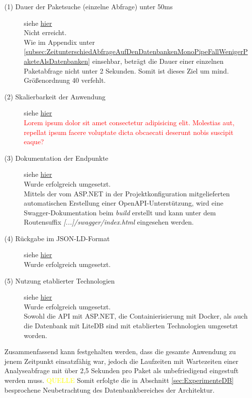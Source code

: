     \begin{description}
        \item[(1) Dauer der Paketsuche (einzelne Abfrage) unter 50ms] siehe \hyperref[nf:one]{\underline{hier}} \hfill \\
            Nicht erreicht.
            \\
            Wie im Appendix unter \ref{subsec:ZeitunterschiedAbfrageAufDenDatenbankenMonoPipeFallWenigerPaketeAlsDatenbanken} einsehbar, beträgt die Dauer einer einzelnen Paketabfrage nicht unter 2 Sekunden.
            Somit ist dieses Ziel um mind. Größenordnung 40 verfehlt.
        \item[(2) Skalierbarkeit der Anwendung] siehe \hyperref[nf:two]{\underline{hier}} \hfill \\
            \textcolor{red}{Lorem ipsum dolor sit amet consectetur adipisicing elit. Molestias aut, repellat ipsum facere voluptate dicta obcaecati deserunt nobis suscipit eaque?}
        \item[(3) Dokumentation der Endpunkte] siehe \hyperref[nf:three]{\underline{hier}} \hfill \\
            Wurde erfolgreich umgesetzt.
            \\
            Mittels der vom ASP.NET in der Projektkonfiguration mitgelieferten automatischen Erstellung einer OpenAPI-Unterstützung, wird eine Swagger-Dokumentation beim \textit{build} erstellt und kann unter dem Routensuffix \textit{[...]/swagger/index.html} eingesehen werden.
        \item[(4) Rückgabe im \acs{JSON-LD}-Format] siehe \hyperref[nf:four]{\underline{hier}} \hfill \\
            Wurde erfolgreich umgesetzt.
        \item[(5) Nutzung etablierter Technologien] siehe \hyperref[nf:five]{\underline{hier}} \hfill \\
            Wurde erfolgreich umgesetzt.
            \\
            Sowohl die \ac{API} mit ASP.NET, die Containierisierung mit Docker, als auch die Datenbank mit LiteDB sind mit etablierten Technologien umgesetzt worden.
    \end{description}

    \noindent Zusammenfassend kann festgehalten werden, dass die gesamte Anwendung zu jenem Zeitpunkt einsatzfähig war, jedoch die Laufzeiten mit Wartezeiten einer Analyseabfrage mit über 2,5 Sekunden pro Paket als unbefriedigend eingestuft werden muss. \textcolor{yellow}{QUELLE}
    Somit erfolgte die in Abschnitt \ref{sec:ExperimenteDB}  besprochene Neubetrachtung des Datenbankbereiches der Architektur.


